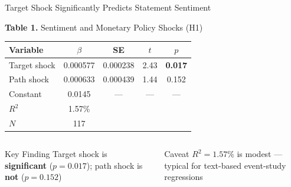 \documentclass[aspectratio=169, 11pt]{beamer}
\begin{document}
\begin{frame}{Target Shock Significantly Predicts Statement Sentiment}
\begin{center}
{\small \textbf{Table 1.} Sentiment and Monetary Policy Shocks (H1)}
\end{center}
\vspace{0.2em}
\begin{center}
{\small
\begin{tabular}{lcccc}
\toprule
Variable & $\beta$ & SE & $t$ & $p$ \\
\midrule
Target shock & 0.000577 & 0.000238 & 2.43 & \textbf{0.017} \\
Path shock & 0.000633 & 0.000439 & 1.44 & 0.152 \\
\midrule
Constant & 0.0145 & --- & --- & --- \\
$R^2$ & 1.57\% & & & \\
$N$ & 117 & & & \\
\bottomrule
\end{tabular}
}
\end{center}

\vspace{0.3em}
\begin{columns}[T]
\begin{aexampleblock}{Key Finding}
Target shock is \textbf{significant} ($p = 0.017$); path shock is \textbf{not} ($p = 0.152$)
\end{aexampleblock}

\begin{aalertblock}{Caveat}
$R^2 = 1.57\%$ is modest --- typical for text-based event-study regressions
\end{aalertblock}
\end{columns}
\end{frame}
\end{document}
